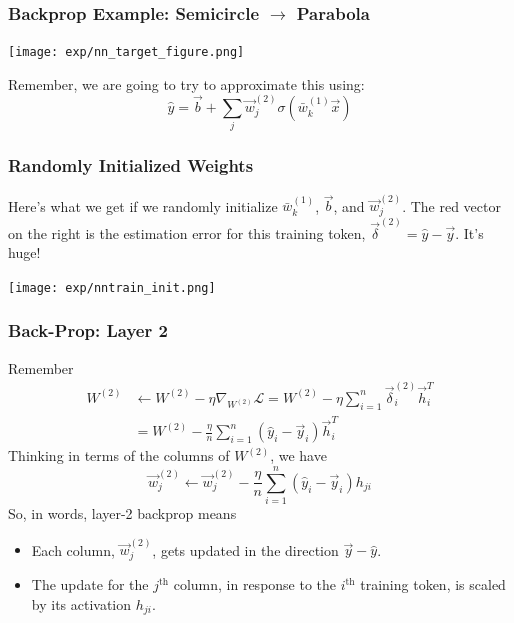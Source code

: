 \documentclass{beamer}
\begin{document}
\begin{frame}
  \frametitle{Backprop Example: Semicircle $\rightarrow$ Parabola}

  \centerline{\texttt{[image: exp/nn\_target\_figure.png]}}

  Remember, we are going to try to approximate this using:
  \[
  \hat{y} = \vec{b} + \sum_j \vec{w}_{j}^{(2)} \sigma\left(\bar{w}_{k}^{(1)} \vec{x}\right)
  \]
\end{frame}

\begin{frame}
  \frametitle{Randomly Initialized Weights}

  Here's what we get if we randomly initialize $\bar{w}_k^{(1)}$,
  $\vec{b}$, and $\vec{w}_j^{(2)}$.  The red vector on the right is
  the estimation error for this training token,
  $\vec\delta^{(2)}=\hat{y}-\vec{y}$.  It's huge!
  \centerline{\texttt{[image: exp/nntrain\_init.png]}}
\end{frame}

\begin{frame}
  \frametitle{Back-Prop: Layer 2}
  Remember
  \begin{align*}
    W^{(2)} &\leftarrow W^{(2)}-\eta\nabla_{W^{(2)}}{\mathcal L}
    = W^{(2)}-\eta\sum_{i=1}^n \vec\delta^{(2)}_i\vec{h}_i^T\\
    &= W^{(2)}-\frac{\eta}{n}\sum_{i=1}^n \left(\hat{y}_i-\vec{y}_i\right)\vec{h}_i^T
  \end{align*}
  Thinking in terms of the columns of $W^{(2)}$, we have
  \[
  \vec{w}_j^{(2)} \leftarrow
  \vec{w}_j^{(2)}-\frac{\eta}{n}\sum_{i=1}^n \left(\hat{y}_i-\vec{y}_i\right)h_{ji}
  \]
  So, in words, layer-2 backprop means
  \begin{itemize}
  \item Each column, $\vec{w}_j^{(2)}$, gets updated in the direction
    $\vec{y}-\hat{y}$.
  \item The update for the $j^{\textrm{th}}$ column, in response to
    the $i^{\textrm{th}}$ training token, is scaled by its
    activation $h_{ji}$.
  \end{itemize}
\end{frame}
\end{document}
